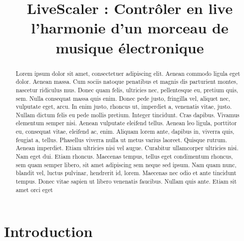 \documentclass{article}
\title{LiveScaler : Contrôler en live l'harmonie d'un morceau de musique électronique}
\begin{document}
  

\maketitle

\begin{abstract}
  Lorem ipsum dolor sit amet, consectetuer adipiscing elit. Aenean commodo ligula eget dolor. Aenean massa. Cum sociis natoque penatibus et magnis dis parturient montes, nascetur ridiculus mus. Donec quam felis, ultricies nec, pellentesque eu, pretium quis, sem. Nulla consequat massa quis enim. Donec pede justo, fringilla vel, aliquet nec, vulputate eget, arcu. In enim justo, rhoncus ut, imperdiet a, venenatis vitae, justo. Nullam dictum felis eu pede mollis pretium. Integer tincidunt. Cras dapibus. Vivamus elementum semper nisi. Aenean vulputate eleifend tellus. Aenean leo ligula, porttitor eu, consequat vitae, eleifend ac, enim. Aliquam lorem ante, dapibus in, viverra quis, feugiat a, tellus. Phasellus viverra nulla ut metus varius laoreet. Quisque rutrum. Aenean imperdiet. Etiam ultricies nisi vel augue. Curabitur ullamcorper ultricies nisi. Nam eget dui. Etiam rhoncus. Maecenas tempus, tellus eget condimentum rhoncus, sem quam semper libero, sit amet adipiscing sem neque sed ipsum. Nam quam nunc, blandit vel, luctus pulvinar, hendrerit id, lorem. Maecenas nec odio et ante tincidunt tempus. Donec vitae sapien ut libero venenatis faucibus. Nullam quis ante. Etiam sit amet orci eget 
\end{abstract}

\begin{comment}
  a comme image à la place d'envoie
cohérence dans la notation des notes 
repliement de l'intervalle
ça marche pas bien quand on sort des modes diatoniques
mode de messiaen : modes à transposition limitée

Expliquiqué dans Techniques de mon langage musical ou dans son cours de composition, tome 1

expliquer dans l'introduction que ce que je veux faire, c'est du live, et faire de la musique

quelques canons stochastiques

Joe Zawinul Modules SEM ou Oberheim claviers en miroirs
\end{comment}

\section{Introduction}

\end{document}
